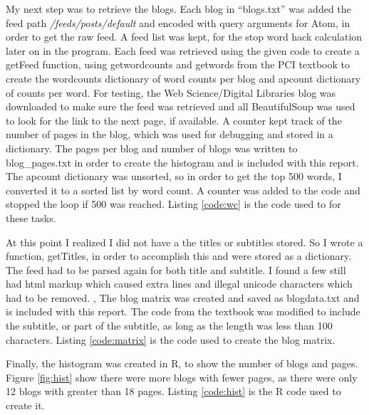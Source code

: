 \documentclass[paper=a4, fontsize=11pt]{scrartcl} %
\numberwithin{equation}{section} %
\numberwithin{figure}{section} %
\numberwithin{table}{section} %
\begin{document}


My next step was to retrieve the blogs.
Each blog in ``blogs.txt'' was added the feed path {\em /feeds/posts/default} and encoded with query arguments for Atom, in order to get the raw feed.
A feed list was kept, for the stop word hack calculation later on in the program.
Each feed was retrieved using the given code to create a getFeed function, using getwordcounts and getwords from the PCI textbook to create the wordcounts dictionary of word counts per blog and apcount dictionary of counts per word. \cite{bib:collective}
For testing, the Web Science/Digital Libraries blog was downloaded to make sure the feed was retrieved and all 
BeautifulSoup was used to look for the link to the next page, if available. \cite{bib:bs4}
A counter kept track of the number of pages in the blog, which was used for debugging and stored in a dictionary.
The pages per blog and number of blogs was written to blog\_pages.txt in order to create the histogram and is included with this report. \cite{bib:dictiter}
The apcount dictionary was unsorted, so in order to get the top 500 words, I converted it to a sorted list by word count.
A counter was added to the code and stopped the loop if 500 was reached.
Listing \ref{code:wc} is the code used to for these tasks.\\



At this point I realized I did not have a the titles or subtitles stored.
So I wrote a function, getTitles, in order to accomplish this and were stored as a dictionary.
The feed had to be parsed again for both title and subtitle.  \cite{bib:atom}
I found a few still had html markup which caused extra lines and illegal unicode characters which had to be removed. \cite{bib:htmlstr},\cite{bib:stripxml}
The blog matrix was created and saved as blogdata.txt and is included with this report.
The code from the textbook was modified to include the subtitle, or part of the subtitle, as long as the length was less than 100 characters. \cite{bib:pystr}
Listing \ref{code:matrix} is the code used to create the blog matrix.\\


\newpage
Finally, the histogram was created in R, to show the number of blogs and pages.
Figure \ref{fig:hist} show there were more blogs with fewer pages, as there were only 12 blogs with greater than 18 pages.
Listing \ref{code:hist} is the R code used to create it.
\end{document}
